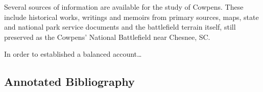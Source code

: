 Several sources of information are available for the study of Cowpens. These
include historical works, writings and memoirs from primary sources, maps, state
and national park service documents and the battlefield terrain itself, still
preserved as the Cowpens' National Battlefield near Chesnee, SC.

In order to established a balanced account\ldots{}

\singlespace
\subsection{Annotated Bibliography}


\vspace{-2em}
\nocite{*}
\nocite{axelrod_real_2007}
\nocite{babits_devil_2001}
\nocite{brinkley_back_1998}
\nocite{buchanan_road_1997}
\nocite{cook_long_1995}
\nocite{curtis_org_1972}
\nocite{dupuy_1977}
\nocite{fleming_cowpens_1988}
\nocite{higginbotham_daniel_1961}
\nocite{kelly_best_1999}
\nocite{lumpkin_savannah_1981}
\nocite{moncure_cowpens_1996}
\nocite{rauch_battle_2007}
\nocite{SC_climatology_tempdata_2000}
\nocite{stephenson_patriot_2007}
\nocite{swisher_duel_2002}
\nocite{symonds_battlefield_1986}
\nocite{tarleton_history_1968}
\nocite{USASC_british_2005}
\nocite{weigley_partisan_1970}
\nocite{wilson_blogmap}
\nocite{woodward_comparative_2002}



